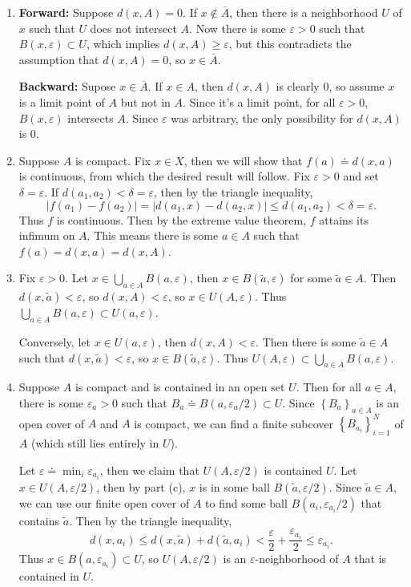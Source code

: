 \documentclass[10pt]{report}
\begin{document}
\begin{enumerate}
	\item \textbf{Forward:} Suppose $d(x,A)=0$. If $x \not\in \overline{A}$, then there is a neighborhood $U$ of $x$ such that $U$ does not intersect $A$. Now there is some $\varepsilon>0$ such that $B(x,\varepsilon)\subset U$, which implies $d(x,A) \geq \varepsilon$, but this contradicts the assumption that $d(x,A)=0$, so $x \in \overline{A}$.

		\textbf{Backward:} Supose $x \in \overline{A}$. If $x \in A$, then $d(x,A)$ is clearly 0, so assume $x$ is a limit point of $A$ but not in $A$. Since it's a limit point, for all $\varepsilon>0$, $B(x,\varepsilon)$ intersects $A$. Since $\varepsilon$ was arbitrary, the only possibility for $d(x,A)$ is 0.

	\item Suppose $A$ is compact. Fix $x \in X$, then we will show that $f(a) \doteq d(x,a)$ is continuous, from which the desired result will follow. Fix $\varepsilon>0$ and set $\delta=\varepsilon$. If $d(a_1,a_2)<\delta=\varepsilon$, then by the triangle inequality,
		\[
			|f(a_1)-f(a_2)| = |d(a_1,x) - d(a_2,x)| \leq d(a_1,a_2) < \delta = \varepsilon.
		\] Thus $f$ is continuous. Then by the extreme value theorem, $f$ attains its infimum on $A$. This means there is some $a \in A$ such that $f(a) = d(x,a) = d(x,A)$.

	\item Fix $\varepsilon>0$. Let $x \in \bigcup_{a \in A} B(a,\varepsilon)$, then $x \in B(\tilde{a},\varepsilon)$ for some $\tilde{a} \in A$. Then $d(x,\tilde{a})<\varepsilon$, so $d(x,A) <\varepsilon$, so $x \in U(A,\varepsilon)$. Thus $\bigcup_{a\in A}B(a,\varepsilon) \subset U(a,\varepsilon)$.

		Conversely, let $x \in U(a,\varepsilon)$, then $d(x,A) < \varepsilon$. Then there is some $\tilde{a} \in A$ such that $d(x,\tilde{a}) < \varepsilon$, so $x \in B(\tilde{a},\varepsilon)$. Thus $U(A,\varepsilon) \subset \bigcup_{a \in A}B(a,\varepsilon)$.

	\item Suppose $A$ is compact and is contained in an open set $U$. Then for all $a \in A$, there is some $\varepsilon_{a}>0$ such that $B_{a} \doteq B(a,\varepsilon_{a}/2) \subset U$. Since $\left\{ B_{a} \right\}_{a \in A}$ is an open cover of $A$ and $A$ is compact, we can find a finite subcover $\left\{ B_{a_i} \right\}_{i=1}^N$ of $A$ (which still lies entirely in $U$).

		Let $\varepsilon \doteq \min_{i} \varepsilon_{a_i}$, then we claim that $U(A,\varepsilon/2)$ is contained $U$. Let $x \in U(A,\varepsilon/2)$, then by part (c), $x$ is in some ball $B(\tilde{a},\varepsilon/2)$. Since $\tilde{a} \in A$, we can use our finite open cover of $A$ to find some ball $B(a_i,\varepsilon_{a_i}/2)$ that contains $\tilde{a}$. Then by the triangle inequality,
		\[
			d(x,a_i) \leq d(x,\tilde{a}) + d(\tilde{a},a_{i}) < \frac{\varepsilon}{2} + \frac{\varepsilon_{a_i}}{2} \leq \varepsilon_{a_i}.
		\] Thus $x \in B(a,\varepsilon_{a_i}) \subset U$, so $U(A,\varepsilon/2)$ is an $\varepsilon$-neighborhood of $A$ that is contained in $U$.


\end{enumerate}
\end{document}
